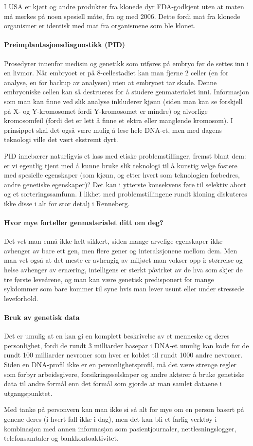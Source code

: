 I USA er kjøtt og andre produkter fra klonede dyr FDA-godkjent uten at maten må merkes på noen spesiell måte, fra og med 2006. Dette fordi mat fra klonede organismer er identisk med mat fra organismene som ble klonet.

\paragraph{Preimplantasjonsdiagnostikk (PID)} Prosedyrer innenfor medisin og genetikk som utføres på embryo før de settes inn i en livmor. Når embryoet er på 8-cellestadiet kan man fjerne 2 celler (en for analyse, en for backup av analysen) uten at embryoet tar skade. Denne embryoniske cellen kan så destrueres for å studere genmaterialet inni. Informasjon som man kan finne ved slik analyse inkluderer kjønn (siden man kan se forskjell på X- og Y-kromosomet fordi Y-kromosomet er mindre) og alvorlige kromosomfeil (fordi det er lett å finne et ektra eller manglende kromosom). I prinsippet skal det også være mulig å lese hele DNA-et, men med dagens teknologi ville det vært ekstremt dyrt. 

PID innebærer naturligvis et lass med etiske problemstillinger, fremst blant dem: er vi egentlig tjent med å kunne bruke slik teknologi til å kunstig velge fostere med spesielle egenskaper (som kjønn, og etter hvert som teknologien forbedres, andre genetiske egenskaper)? Det kan i ytterste konsekvens føre til selektiv abort og et sorteringssamfunn. I likhet med problemstillingene rundt kloning diskuteres ikke disse i alt for stor detalj i Renneberg.

\paragraph{Hvor mye forteller genmaterialet ditt om deg?} Det vet man ennå ikke helt sikkert, siden mange arvelige egenskaper ikke avhenger av bare ett gen, men flere gener og interaksjonene mellom dem. Men man vet også at det meste er avhengig av miljøet man vokser opp i: størrelse og helse avhenger av ernæring, intelligens er sterkt påvirket av de hva som skjer de tre første leveårene, og man kan være genetisk predisponert for mange sykdommer som bare kommer til syne hvis man lever usunt eller under stressede leveforhold.

\paragraph{Bruk av genetisk data} Det er umulig at en  kan gi en komplett beskrivelse av et menneske og deres personlighet, fordi de rundt 3 milliarder basepar i DNA-et umulig kan kode for de rundt 100 milliarder nevroner som hver er koblet til rundt 1000 andre nevroner. Siden en DNA-profil ikke er en personlighetsprofil, må det være strenge regler som forbyr arbeidsgivere, forsikringsselskaper og andre aktører å bruke genetiske data til andre formål enn det formål som gjorde at man samlet dataene i utgangspunktet.

Med tanke på personvern kan man ikke si så alt for mye om en person basert på genene deres (i hvert fall ikke i dag), men det kan bli et farlig verktøy i kombinasjon med annen informasjon som pasientjournaler, nettlesningslogger, telefonsamtaler og bankkontoaktivitet.

